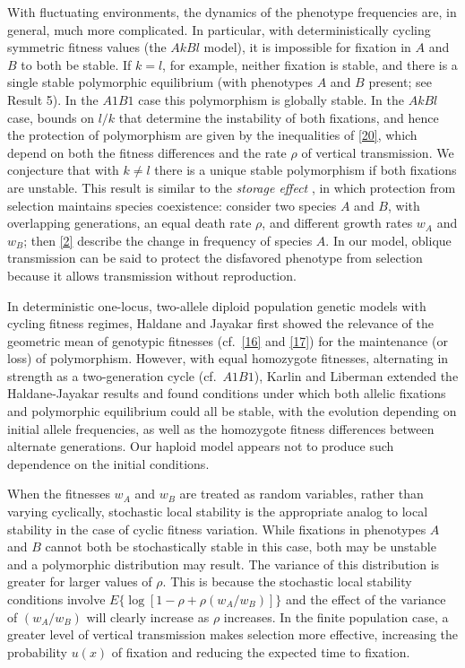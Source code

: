 \documentclass[9pt,twocolumn,twoside,lineno]{pnas-new}
\begin{document}
 With fluctuating environments, the dynamics of the phenotype frequencies are, in general, much more complicated. In particular, with deterministically cycling symmetric fitness values (the $AkBl$ model), it is impossible for fixation in $A$ and $B$ to both be stable. If $k=l$, for example, neither fixation is stable, and there is a single stable polymorphic equilibrium (with phenotypes $A$ and $B$ present; see Result 5). In the $A1B1$ case this  polymorphism is globally stable. In the $AkBl$ case, bounds on $l/k$ that determine the instability of both fixations, and hence the protection of polymorphism are given by the inequalities of \eqref{20}, which depend on both the fitness differences and the rate $\rho$ of vertical transmission. We conjecture that with $k\ne l$ there is a unique stable polymorphism if both fixations are unstable.
This result is similar to the \emph{storage effect} \cite{chesson1981}, in which protection from selection maintains species coexistence: consider two species $A$ and $B$, with overlapping generations, an equal death rate $\rho$, and different growth rates $w_A$ and $w_B$; then \eqref{2} describe the change in frequency of species $A$. In our model, oblique transmission can be said to protect the disfavored phenotype from selection because it allows transmission without reproduction.
 
 In deterministic one-locus, two-allele diploid population genetic models with cycling fitness regimes, Haldane and Jayakar \cite{haldane1963polymorphism} first showed the relevance of the geometric mean of genotypic fitnesses (cf.\ \eqref{16} and \eqref{17}) for the maintenance (or loss) of polymorphism. However, with equal homozygote fitnesses, alternating in strength as a two-generation cycle (cf.\ $A1B1$), Karlin and Liberman \cite{karlin1975random} extended the Haldane-Jayakar results and found conditions under which both allelic fixations and polymorphic equilibrium could all be stable, with the evolution depending on initial allele frequencies, as well as the homozygote fitness differences between alternate generations. Our haploid model appears not to produce such dependence on the initial conditions.
 
 When the fitnesses $w_A$ and $w_B$ are treated as random variables, rather than varying cyclically, stochastic local stability is the appropriate analog to local stability in the case of cyclic fitness variation. While fixations in phenotypes $A$ and $B$ cannot both be stochastically stable in this case, both may be unstable and a polymorphic distribution may result. The variance of this distribution is greater for larger values of $\rho$. This is because the  stochastic local stability conditions involve $E\bigl\{\log[1-\rho+\rho(w_A/w_B)]\bigr\}$ and the effect of the variance of $(w_A/w_B)$ will clearly increase as $\rho$ increases. In the finite population case, a greater level of vertical transmission makes selection more effective, increasing the probability $u(x)$ of fixation and reducing the expected time to fixation.
 
\end{document}
